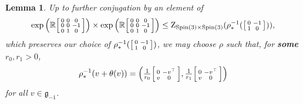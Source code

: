 \documentclass[12pt,a4paper]{amsart}
\newtheorem{lemma}[theorem]{Lemma}
\theoremstyle{definition}
\DeclareMathOperator{\Spin}{Spin}
\newenvironment{smallbmatrix}
  {\left[\begin{smallmatrix}}
  {\end{smallmatrix}\right]}
\newcommand{\rotoiso}{\begin{smallbmatrix}0 & -1 \\ 1 & 0\end{smallbmatrix}}
\begin{document}
\begin{lemma}\label{setrolleye} Up to further conjugation by an element of
\[\exp\left(\mathbb{R}\begin{smallbmatrix}0 & 0 & 0 \\ 0 & 0 & -1 \\ 0 & 1 & 0\end{smallbmatrix}\right)\times\exp\left(\mathbb{R}\begin{smallbmatrix}0 & 0 & 0 \\ 0 & 0 & -1 \\ 0 & 1 & 0\end{smallbmatrix}\right)\leq\mathrm{Z}_{\Spin(3)\times\Spin(3)}(\rho_*^{-1}(\rotoiso)),\]
which preserves our choice of $\rho_*^{-1}(\rotoiso)$, we may choose $\rho$ such that, for \textbf{some} $r_0,r_1>0$,
\[\rho_*^{-1}(v+\theta(v))=\left(\tfrac{1}{r_0}\begin{smallbmatrix}0 & -v^\top \\ v & 0\end{smallbmatrix},\tfrac{1}{r_1}\begin{smallbmatrix}0 & -v^\top \\ v & 0\end{smallbmatrix}\right)\]
for all $v\in\mathfrak{g}_{-1}$.\end{lemma}
\end{document}
